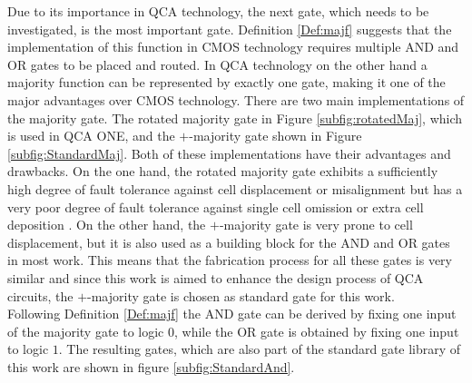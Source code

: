 Due to its importance in QCA technology, the next gate, which needs to be investigated, is the most important gate. Definition \ref{Def:majf} suggests that the implementation of this function in CMOS technology requires multiple AND and OR gates to be placed and routed. In QCA technology on the other hand a majority function can be represented by exactly one gate, making it one of the major advantages over CMOS technology. There are two main implementations of the majority gate. The rotated majority gate in Figure \ref{subfig:rotatedMaj}, which is used in QCA ONE, and the $+$-majority gate shown in Figure \ref{subfig:StandardMaj}. Both of these implementations have their advantages and drawbacks. On the one hand, the rotated majority gate exhibits a sufficiently high degree of fault tolerance against cell displacement or misalignment but has a very poor degree of fault tolerance against single cell omission or extra cell deposition \cite{majorityrotated}. On the other hand, the $+$-majority gate is very prone to cell displacement, but it is also used as a building block for the AND and OR gates in most work. This means that the fabrication process for all these gates is very similar and since this work is aimed to enhance the design process of QCA circuits, the $+$-majority gate is chosen as standard gate for this work.\\
Following Definition \ref{Def:majf} the AND gate can be derived by fixing one input of the majority gate to logic $0$, while the OR gate is obtained by fixing one input to logic $1$. The resulting gates, which are also part of the standard gate library of this work are shown in figure \ref{subfig:StandardAnd}.\\

